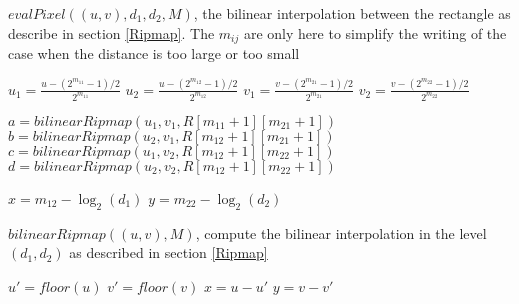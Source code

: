 \begin{algorithm}[H]
\caption{$evalPixel((u,v),d_1,d_2,M)$, the bilinear interpolation between the rectangle as describe in section \ref{Ripmap}.
The $m_{ij}$ are only here to simplify the writing of the case when the distance is too large or too small}
\label{interbibi1}
$u_1=\frac{u-(2^{m_{11}}-1)/2}{2^{m_{11}}}$\;
$u_2=\frac{u-(2^{m_{12}}-1)/2}{2^{m_{12}}}$\;
$v_1=\frac{v-(2^{m_{21}}-1)/2}{2^{m_{21}}}$\;
$v_2=\frac{v-(2^{m_{22}}-1)/2}{2^{m_{22}}}$\;

$a=bilinearRipmap(u_1,v_1,R[m_{11}+1][m_{21}+1])$\;
$b=bilinearRipmap(u_2,v_1,R[m_{12}+1][m_{21}+1])$\;
$c=bilinearRipmap(u_1,v_2,R[m_{12}+1][m_{22}+1])$\;
$d=bilinearRipmap(u_2,v_2,R[m_{12}+1][m_{22}+1])$\;

$x = m_{12} - \log_2(d_1)$\;
$y = m_{22} - \log_2(d_2)$\;

\end{algorithm}


\begin{algorithm}[H]
\caption{$bilinearRipmap((u,v),M)$, compute the bilinear interpolation in the level $(d_1,d_2)$ as described in section \ref{Ripmap}}
\label{intertri2}
$u'=floor(u)$\;
$v' = floor(v)$\;
$x=u-u'$\;
$y = v-v'$\;
\;
\end{algorithm}



